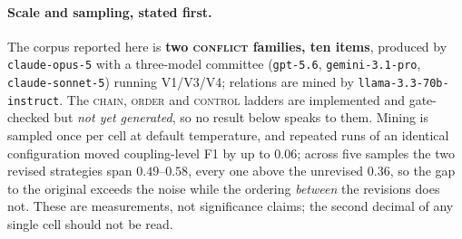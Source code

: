 \documentclass{article} %
\begin{document}
\paragraph{Scale and sampling, stated first.} The corpus reported here is \textbf{two
\textsc{conflict} families, ten items}, produced by \texttt{claude-opus-5} with a three-model
committee (\texttt{gpt-5.6}, \texttt{gemini-3.1-pro}, \texttt{claude-sonnet-5}) running V1/V3/V4;
relations are mined by \texttt{llama-3.3-70b-instruct}. The \textsc{chain}, \textsc{order} and
\textsc{control} ladders are implemented and gate-checked but \emph{not yet generated}, so no
result below speaks to them. Mining is sampled once per cell at default temperature, and repeated
runs of an identical configuration moved coupling-level F1 by up to $0.06$; across five samples the
two revised strategies span $0.49$--$0.58$, every one above the unrevised $0.36$, so the gap to the
original exceeds the noise while the ordering \emph{between} the revisions does not. These are
measurements, not significance claims; the second decimal of any single cell should not be read.
\end{document}
